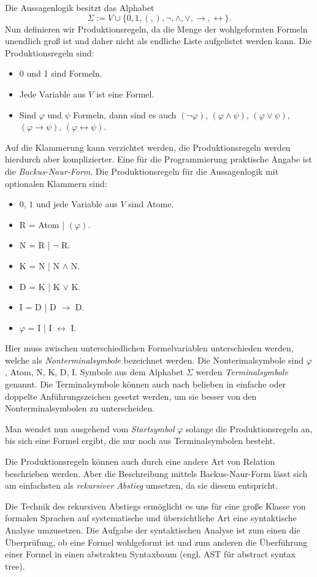 \documentclass[a4paper,11pt,fleqn,twoside]{scrartcl}
\numberwithin{equation}{section}
\theoremstyle{rmbox}
\newcommand{\emdef}[1]{\emph{#1}}
\newcommand{\bitem}{\item[\scriptsize\color{gray1}$\blacksquare$]}
\begin{document}
Die Aussagenlogik besitzt das Alphabet
\begin{equation}
\Sigma := V\cup\{0,1,(,),\neg,\land,\lor,\rightarrow,\leftrightarrow\}.
\end{equation}
Nun definieren wir Produktionsregeln, da die Menge der wohlgeformten
Formeln unendlich groß ist und daher nicht als endliche Liste
aufgelistet werden kann. Die Produktionsregeln sind:
\begin{itemize}[noitemsep,topsep=2pt]
\setlength\itemsep{4pt}
\bitem 0 und 1 sind Formeln.
\bitem Jede Variable aus $V$ ist eine Formel.
\bitem Sind $\varphi$ und $\psi$ Formeln, dann sind es auch
   $(\neg \varphi)$, $(\varphi\land\psi)$, $(\varphi\lor\psi)$,
   $(\varphi\rightarrow\psi)$, $(\varphi\leftrightarrow\psi)$.
\end{itemize}
Auf die Klammerung kann verzichtet werden, die Produktionsregeln
werden hierdurch aber komplizierter. Eine für die Programmierung
praktische Angabe ist die \emdef{Backus-Naur-Form}. Die
Produktionsregeln für die Aussagenlogik mit optionalen Klammern sind:
\begin{itemize}[noitemsep,topsep=2pt]
\setlength\itemsep{4pt}
\bitem $0$, $1$ und jede Variable aus $V$ sind Atome.
\bitem R = Atom | $(\varphi)$.
\bitem N = R | $\neg$ R.
\bitem K = N | N $\land$ N.
\bitem D = K | K $\lor$ K.
\bitem I = D | D $\rightarrow$ D.
\bitem $\varphi$ = I | I $\leftrightarrow$ I.
\end{itemize}
\pagebreak[2]
Hier muss zwischen unterschiedlichen Formelvariablen unterschieden
werden, welche als \emdef{Nonterminalsymbole} bezeichnet werden.
Die Nonterimalsymbole sind $\varphi$, Atom, N, K, D, I.
Symbole aus dem Alphabet $\Sigma$ werden \emdef{Terminalsymbole}
genannt. Die Terminalsymbole können auch nach belieben in einfache
oder doppelte Anführungszeichen gesetzt werden, um sie besser
von den Nonterminalsymbolen zu unterscheiden.

Man wendet nun ausgehend vom \emdef{Startsymbol} $\varphi$
solange die Produktionsregeln an, bis sich eine Formel ergibt,
die nur noch aus Terminalsymbolen besteht.

Die Produktionsregeln können auch durch eine andere Art von
Relation beschrieben werden. Aber die Beschreibung mittels
Backus-Naur-Form lässt sich am einfachsten als
\emdef{rekursiver Abstieg} umsetzen, da sie diesem entspricht.

Die Technik des rekursiven Abstiegs ermöglicht es uns für
eine große Klasse von formalen Sprachen auf systematische
und übersichtliche Art eine syntaktische Analyse umzusetzen.
Die Aufgabe der syntaktischen Analyse ist zum einen die Überprüfung,
ob eine Formel wohlgeformt ist und zum anderen die Überführung
einer Formel in einen abstrakten Syntaxbaum (engl. AST für
abstract syntax tree).
\end{document}
